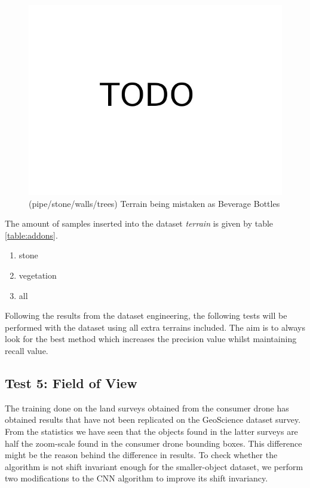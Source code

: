 \documentclass{IEEEtran}
\begin{document}
\begin{figure}[H]
\centering
\includegraphics[scale=0.25]{images/todo.jpg}
\caption{(pipe/stone/walls/trees) Terrain being mistaken as Beverage Bottles}
\label{fig:mistakes}
\end{figure}

The amount of samples inserted into the dataset \textit{terrain} is given by table \ref{table:addons}. 

\begin{enumerate}
\item{stone}
\item{vegetation}
\item{all}
\end{enumerate}

Following the results from the dataset engineering, the following tests will be performed with the dataset using all extra terrains included. The aim is to always look for the best method which increases the precision value whilst maintaining recall value.

\subsection{Test 5: Field of View}

The training done on the land surveys obtained from the consumer drone has obtained results that have not been replicated on the GeoScience dataset survey. From the statistics we have seen that the objects found in the latter surveys are half the zoom-scale found in the consumer drone bounding boxes. This difference might be the reason behind the difference in results. To check whether the algorithm is not shift invariant enough for the smaller-object dataset, we perform two modifications to the CNN algorithm to improve its shift invariancy.
\end{document}
